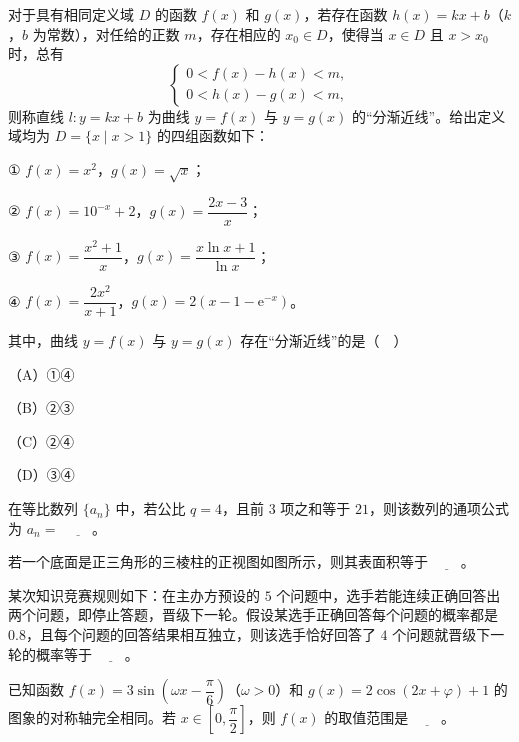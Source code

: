 \begin{question}
对于具有相同定义域 $D$ 的函数 $f(x)$ 和 $g(x)$，若存在函数 $h(x)=kx+b$（$k$，$b$ 为常数），对任给的正数 $m$，存在相应的 $x_0\in D$，使得当 $x\in D$ 且 $x>x_0$ 时，总有
\nopagebreak[4]
\[\begin{cases}0<f(x)-h(x)<m,\\0<h(x)-g(x)<m,\end{cases}\]
则称直线 $l\colon y=kx+b$ 为曲线 $y=f(x)$ 与 $y=g(x)$ 的“分渐近线”。给出定义域均为 $D=\{x\mid x>1\}$ 的四组函数如下：

① $f(x)=x^2$，$g(x)=\sqrt x$；

② $f(x)=10^{-x}+2$，$g(x)=\dfrac{2x-3}{x}$；

③ $f(x)=\dfrac{x^2+1}{x}$，$g(x)=\dfrac{x\ln x+1}{\ln x}$；

④ $f(x)=\dfrac{2x^2}{x+1}$，$g(x)=2\left(x-1-\mathrm{e}^{-x}\right)$。

其中，曲线 $y=f(x)$ 与 $y=g(x)$ 存在“分渐近线”的是（　）

（A）①④

（B）②③

（C）②④

（D）③④

\end{question}
\begin{question}
在等比数列 $\{a_n\}$ 中，若公比 $q=4$，且前 $3$ 项之和等于 $21$，则该数列的通项公式为 $a_n=$ $\underline{\qquad}$。

\Needspace{0.4\textheight}
\end{question}
\begingroup
\renewenvironment{question}{\Needspace{0.5\textheight}}{}
\begin{question}
若一个底面是正三角形的三棱柱的正视图如图所示，则其表面积等于 $\underline{\qquad}$。
\nopagebreak[4]
\begin{center}\end{center}
\nopagebreak[4]
\end{question}
\endgroup
\begin{question}
某次知识竞赛规则如下：在主办方预设的 $5$ 个问题中，选手若能连续正确回答出两个问题，即停止答题，晋级下一轮。假设某选手正确回答每个问题的概率都是 $0.8$，且每个问题的回答结果相互独立，则该选手恰好回答了 $4$ 个问题就晋级下一轮的概率等于 $\underline{\qquad}$。

\end{question}
\begin{question}
已知函数 $f(x)=3\sin\left(\omega x-\dfrac{\pi}{6}\right)$（$\omega>0$）和 $g(x)=2\cos(2x+\varphi)+1$ 的图象的对称轴完全相同。若 $x\in\left[0,\dfrac{\pi}{2}\right]$，则 $f(x)$ 的取值范围是 $\underline{\qquad}$。

\end{question}
